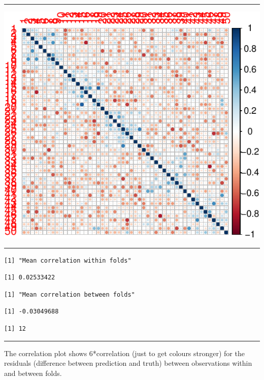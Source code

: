 \documentclass[
  letterpaper,
  DIV=11,
  numbers=noendperiod]{scrartcl}
\begin{document}
\begin{center}\rule{0.5\linewidth}{0.5pt}\end{center}

\includegraphics{L17v2_files/figure-pdf/unnamed-chunk-21-1.pdf}

\begin{center}\rule{0.5\linewidth}{0.5pt}\end{center}

\begin{verbatim}
[1] "Mean correlation within folds"
\end{verbatim}

\begin{verbatim}
[1] 0.02533422
\end{verbatim}

\begin{verbatim}
[1] "Mean correlation between folds"
\end{verbatim}

\begin{verbatim}
[1] -0.03049688
\end{verbatim}

\begin{verbatim}
[1] 12
\end{verbatim}

\begin{center}\rule{0.5\linewidth}{0.5pt}\end{center}

The correlation plot shows 6*correlation (just to get colours stronger)
for the residuals (difference between prediction and truth) between
observations within and between folds.
\end{document}
